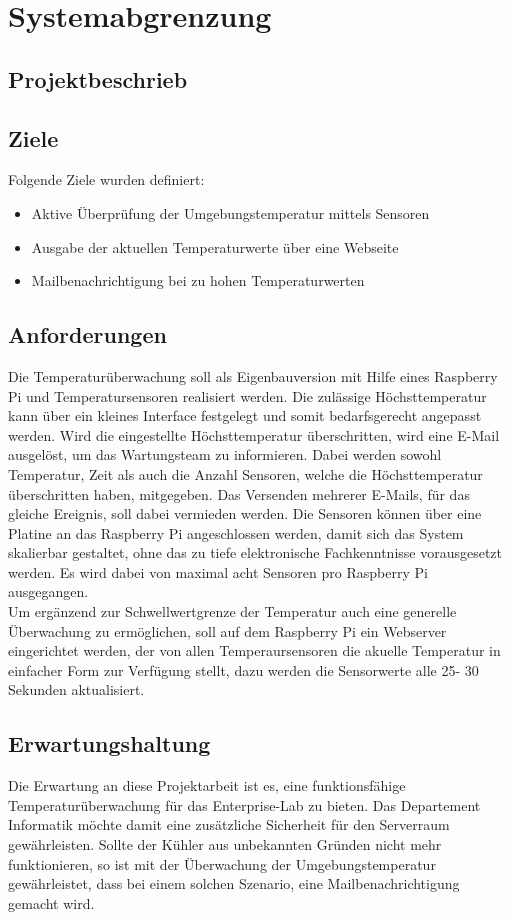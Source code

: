 \section{Systemabgrenzung}
\subsection{Projektbeschrieb}
\subsection{Ziele}
Folgende Ziele wurden definiert:
\begin{itemize}
\item Aktive Überprüfung der Umgebungstemperatur mittels Sensoren
\item Ausgabe der aktuellen Temperaturwerte über eine Webseite
\item Mailbenachrichtigung bei zu hohen Temperaturwerten
\end{itemize}

\subsection{Anforderungen}
Die Temperaturüberwachung soll als Eigenbauversion mit Hilfe eines Raspberry Pi und Temperatursensoren realisiert werden. Die zulässige Höchsttemperatur kann über ein kleines Interface festgelegt und somit bedarfsgerecht angepasst werden. Wird die eingestellte Höchsttemperatur überschritten, wird eine E-Mail ausgelöst, um das Wartungsteam zu informieren. Dabei werden sowohl Temperatur, Zeit als auch die Anzahl Sensoren, welche die Höchsttemperatur überschritten haben, mitgegeben. Das Versenden mehrerer E-Mails, für das gleiche Ereignis, soll dabei vermieden werden. Die Sensoren können über eine Platine an das Raspberry Pi angeschlossen werden, damit sich das System skalierbar gestaltet, ohne das zu tiefe elektronische Fachkenntnisse vorausgesetzt werden. Es wird dabei von maximal acht Sensoren pro Raspberry Pi ausgegangen.\\
Um ergänzend zur Schwellwertgrenze der Temperatur auch eine generelle Überwachung zu ermöglichen, soll auf dem Raspberry Pi ein Webserver eingerichtet werden, der von allen Temperaursensoren die akuelle Temperatur in einfacher Form zur Verfügung stellt, dazu werden die Sensorwerte alle 25- 30 Sekunden aktualisiert.
\subsection{Erwartungshaltung}
Die Erwartung an diese Projektarbeit ist es, eine funktionsfähige  Temperaturüberwachung für das Enterprise-Lab zu bieten. Das Departement Informatik möchte damit eine zusätzliche Sicherheit für den Serverraum gewährleisten. Sollte der Kühler aus unbekannten Gründen nicht mehr funktionieren, so ist mit der Überwachung der Umgebungstemperatur gewährleistet, dass bei einem solchen Szenario, eine Mailbenachrichtigung gemacht wird.
